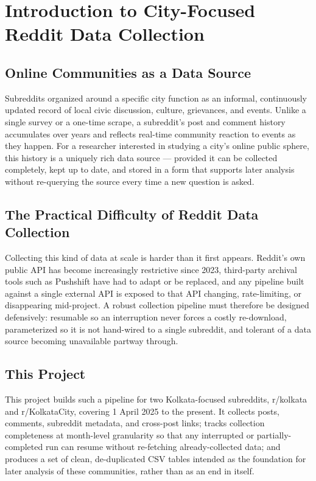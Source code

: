 \documentclass[12pt]{article}
\begin{document}
\clearpage

\section{Introduction to City-Focused Reddit Data Collection}

\subsection{Online Communities as a Data Source}
Subreddits organized around a specific city function as an informal, continuously updated
record of local civic discussion, culture, grievances, and events. Unlike a single survey or a
one-time scrape, a subreddit's post and comment history accumulates over years and reflects
real-time community reaction to events as they happen. For a researcher interested in studying
a city's online public sphere, this history is a uniquely rich data source — provided it can be
collected completely, kept up to date, and stored in a form that supports later analysis without
re-querying the source every time a new question is asked.

\subsection{The Practical Difficulty of Reddit Data Collection}
Collecting this kind of data at scale is harder than it first appears. Reddit's own public API has
become increasingly restrictive since 2023, third-party archival tools such as Pushshift have
had to adapt or be replaced, and any pipeline built against a single external API is exposed to
that API changing, rate-limiting, or disappearing mid-project. A robust collection pipeline must
therefore be designed defensively: resumable so an interruption never forces a costly
re-download, parameterized so it is not hand-wired to a single subreddit, and tolerant of a data
source becoming unavailable partway through.

\subsection{This Project}
This project builds such a pipeline for two Kolkata-focused subreddits, r/kolkata and
r/KolkataCity, covering 1 April 2025 to the present. It collects posts, comments, subreddit
metadata, and cross-post links; tracks collection completeness at month-level granularity so
that any interrupted or partially-completed run can resume without re-fetching already-collected
data; and produces a set of clean, de-duplicated CSV tables intended as the foundation for later
analysis of these communities, rather than as an end in itself.
\end{document}
